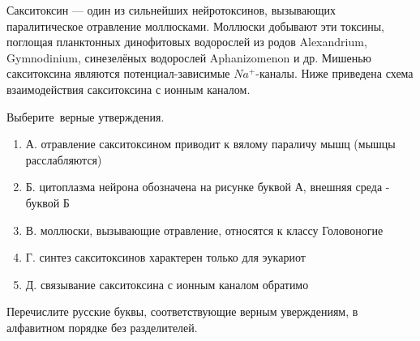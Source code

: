
Сакситоксин — один из сильнейших нейротоксинов, вызывающих паралитическое отравление моллюсками. Моллюски добывают эти токсины, поглощая планктонных динофитовых водорослей из родов Alexandrium, Gymnodinium, синезелёных водорослей Aphanizomenon и др. Мишенью сакситоксина являются потенциал-зависимые $Na^+$-каналы. Ниже приведена схема взаимодействия сакситоксина с ионным каналом.


Выберите верные утверждения.

\begin{enumerate}
    \item А. отравление сакситоксином приводит к вялому параличу мышц (мышцы расслабляются)
    \item Б. цитоплазма нейрона обозначена на рисунке буквой А, внешняя среда - буквой Б
    \item В. моллюски, вызывающие отравление, относятся к классу Головоногие
    \item Г. синтез сакситоксинов характерен только для эукариот
    \item Д. связывание сакситоксина с ионным каналом обратимо
\end{enumerate}

Перечислите русские буквы, соответствующие верным уверждениям, в алфавитном порядке без разделителей.
